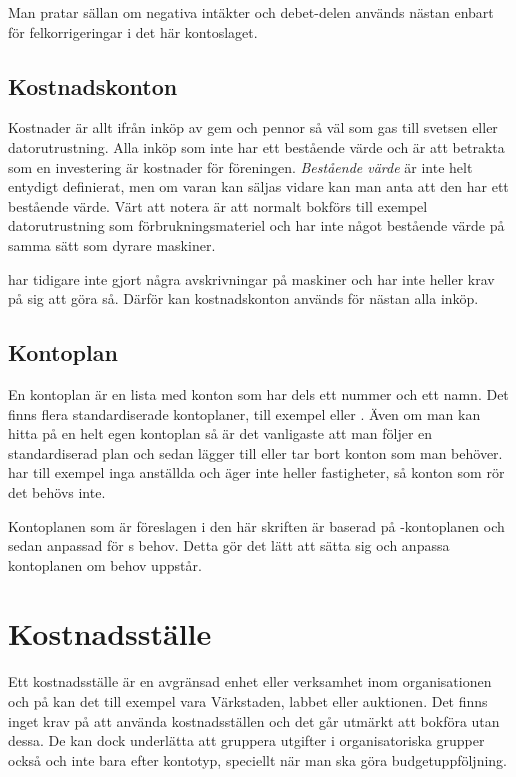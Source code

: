 Man pratar sällan om negativa intäkter och debet-delen används nästan enbart för felkorrigeringar i det här kontoslaget.

\subsection{Kostnadskonton}
\noindent Kostnader är allt ifrån inköp av gem och pennor så väl som gas till svetsen eller datorutrustning. Alla inköp som inte har ett bestående värde och är att betrakta som en investering är kostnader för föreningen. \emph{Bestående värde} är inte helt entydigt definierat, men om varan kan säljas vidare kan man anta att den har ett bestående värde. Värt att notera är att normalt bokförs till exempel datorutrustning som förbrukningsmateriel och har inte något bestående värde på samma sätt som dyrare maskiner.

 har tidigare inte gjort några avskrivningar på maskiner och har inte heller krav på sig att göra så.  Därför kan kostnadskonton används för nästan alla inköp.

\subsection{Kontoplan}
En kontoplan är en lista med konton som har dels ett nummer och ett namn. Det finns flera standardiserade kontoplaner, till exempel  eller . 
Även om man kan hitta på en helt egen kontoplan så är det vanligaste att man följer en standardiserad plan och sedan lägger till eller tar bort konton som man behöver.  har till exempel inga anställda och äger inte heller fastigheter, så konton som rör det behövs inte.

Kontoplanen som är föreslagen i den här skriften är baserad på -kontoplanen och sedan anpassad för s behov. Detta gör det lätt att sätta sig och anpassa kontoplanen om behov uppstår.

\section{Kostnadsställe}
Ett kostnadsställe är en avgränsad enhet eller verksamhet inom organisationen och på  kan det till exempel vara Värkstaden, labbet eller auktionen. Det finns inget krav på att använda kostnadsställen och det går utmärkt att bokföra utan dessa. De kan dock underlätta att gruppera utgifter i organisatoriska grupper också och inte bara efter kontotyp, speciellt när man ska göra budgetuppföljning. 

